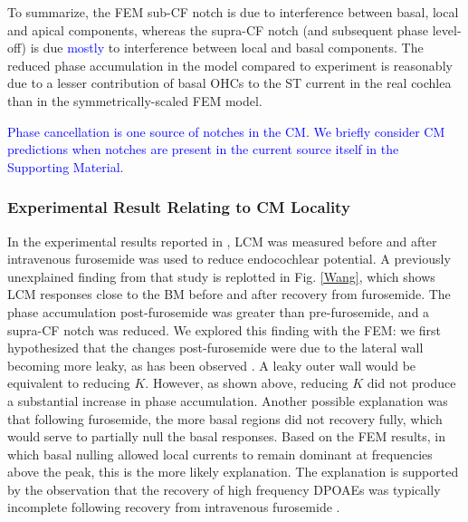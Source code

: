 \documentclass{biophys-new}
\begin{document}
\par{To summarize, the FEM sub-CF notch is due to interference between basal, local and apical components, whereas the supra-CF notch (and subsequent phase level-off) is due \textcolor{blue}{mostly} to interference between local and basal components. The reduced phase accumulation in the model compared to experiment is reasonably due to a lesser contribution of basal OHCs to the ST current in the real cochlea than in the symmetrically-scaled FEM model.} 
\par{\textcolor{blue}{Phase cancellation is one source of notches in the CM. We briefly consider CM predictions when notches are present in the current source itself in the Supporting Material.}}

\subsubsection{Experimental Result Relating to CM Locality}
\par{In the experimental results reported in \cite{wang_fallah_olson}, LCM was measured before and after intravenous furosemide was used to reduce endocochlear potential.  A previously unexplained finding from that study is replotted in Fig. \ref{Wang}, which shows LCM responses close to the BM before and after recovery from furosemide.  The phase accumulation post-furosemide was greater than pre-furosemide, and a supra-CF notch was reduced. We explored this finding with the FEM:  we first hypothesized that the changes post-furosemide were due to the lateral wall becoming more leaky, as has been observed \cite{furosemide2020}. A leaky outer wall would be equivalent to reducing $K$. However, as shown above, reducing $K$ did not produce a substantial increase in phase accumulation.  Another possible explanation was that following furosemide, the more basal regions did not recovery fully, which would serve to partially null the basal responses.  Based on the FEM results, in which basal nulling allowed local currents to remain dominant at frequencies above the peak, this is the more likely explanation.  The explanation is supported by the observation that the recovery of high frequency DPOAEs was typically incomplete following recovery from intravenous furosemide \cite{wang_fallah_olson, strimbu_wang_olson}.}  
\end{document}
